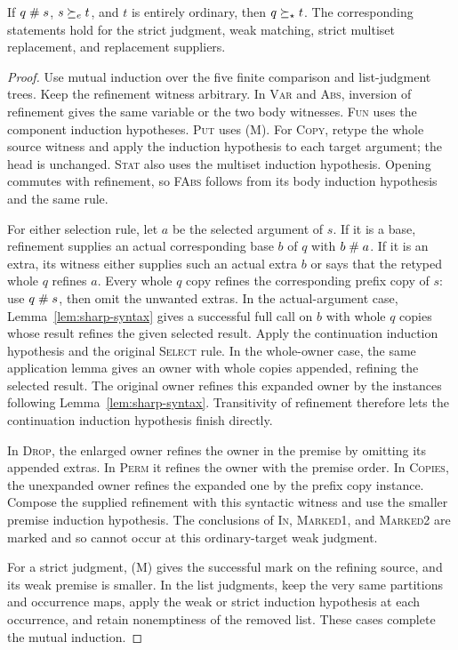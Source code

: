 \begin{lemma}\label{lem:conservative}
If $q\mathrel{\#} s$, $s\succeq_e t$, and $t$ is entirely ordinary,
then $q\succeq_\star t$. The corresponding statements hold for the
strict judgment, weak matching, strict multiset replacement,
and replacement suppliers.
\end{lemma}
\begin{proof}
Use mutual induction over the five finite comparison and
list-judgment trees. Keep the refinement witness arbitrary.
In \textsc{Var} and \textsc{Abs}, inversion of refinement
gives the same variable or the two body witnesses.
\textsc{Fun} uses the component induction hypotheses.
\textsc{Put} uses (M). For \textsc{Copy}, retype the whole
source witness and apply the induction hypothesis to each
target argument; the head is unchanged. \textsc{Stat} also
uses the multiset induction hypothesis. Opening commutes
with refinement, so \textsc{FAbs} follows from its body
induction hypothesis and the same rule.

For either selection rule, let $a$ be the selected argument
of $s$. If it is a base, refinement supplies an actual
corresponding base $b$ of $q$ with $b\mathrel{\#} a$. If it is
an extra, its witness either supplies such an actual extra
$b$ or says that the retyped whole $q$ refines $a$.
Every whole $q$ copy refines the corresponding prefix copy
of $s$: use $q\mathrel{\#} s$, then omit the unwanted extras.
In the actual-argument case, Lemma~\ref{lem:sharp-syntax}
gives a successful full call on $b$ with whole $q$ copies
whose result refines the given selected result. Apply the
continuation induction hypothesis and the original
\textsc{Select} rule.
In the whole-owner case, the same application lemma gives
an owner with whole copies appended, refining the selected
result. The original owner refines this expanded owner by
the instances following Lemma~\ref{lem:sharp-syntax}.
Transitivity of refinement therefore lets the continuation
induction hypothesis finish directly.

In \textsc{Drop}, the enlarged owner refines the owner in
the premise by omitting its appended extras. In \textsc{Perm}
it refines the owner with the premise order. In \textsc{Copies},
the unexpanded owner refines the expanded one by the prefix
copy instance. Compose the supplied refinement with this
syntactic witness and use the smaller premise induction
hypothesis.
The conclusions of \textsc{In}, \textsc{Marked1}, and
\textsc{Marked2} are marked and so cannot occur at this
ordinary-target weak judgment.

For a strict judgment, (M) gives the successful mark on the
refining source, and its weak premise is smaller. In the
list judgments, keep the very same partitions and
occurrence maps, apply the weak or strict induction
hypothesis at each occurrence, and retain nonemptiness of
the removed list. These cases complete the mutual induction.
\end{proof}


